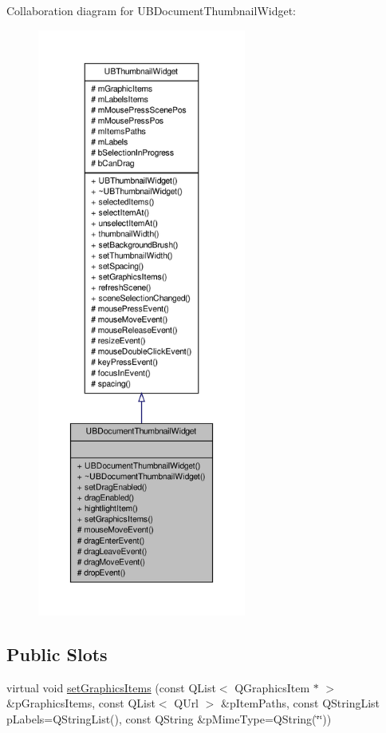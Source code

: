 Collaboration diagram for U\-B\-Document\-Thumbnail\-Widget\-:
\nopagebreak
\begin{figure}[H]
\begin{center}
\leavevmode
\includegraphics[height=550pt]{d6/d1a/class_u_b_document_thumbnail_widget__coll__graph}
\end{center}
\end{figure}
\subsection*{Public Slots}
\begin{DoxyCompactItemize}
\item 
virtual void \hyperlink{class_u_b_document_thumbnail_widget_a2ae5e6495f1a4d0841ffdf94d16eadd9}{set\-Graphics\-Items} (const Q\-List$<$ Q\-Graphics\-Item $\ast$ $>$ \&p\-Graphics\-Items, const Q\-List$<$ Q\-Url $>$ \&p\-Item\-Paths, const Q\-String\-List p\-Labels=Q\-String\-List(), const Q\-String \&p\-Mime\-Type=Q\-String(\char`\"{}\char`\"{}))
\end{DoxyCompactItemize}
